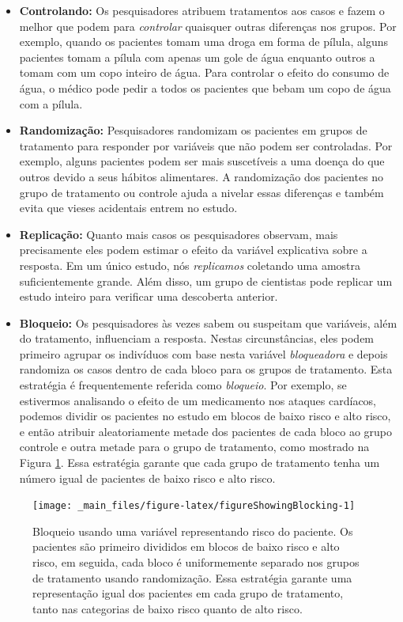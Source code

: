 \documentclass[
]{book}
\theoremstyle{definition}
\theoremstyle{definition}
\theoremstyle{definition}
\theoremstyle{definition}
\theoremstyle{remark}
\begin{document}
\begin{itemize}
\item
  \textbf{Controlando:} Os pesquisadores atribuem tratamentos aos casos e fazem o melhor que podem para \emph{controlar} quaisquer outras diferenças nos grupos. Por exemplo, quando os pacientes tomam uma droga em forma de pílula, alguns pacientes tomam a pílula com apenas um gole de água enquanto outros a tomam com um copo inteiro de água. Para controlar o efeito do consumo de água, o médico pode pedir a todos os pacientes que bebam um copo de água com a pílula.
\item
  \textbf{Randomização:} Pesquisadores randomizam os pacientes em grupos de tratamento para responder por variáveis que não podem ser controladas. Por exemplo, alguns pacientes podem ser mais suscetíveis a uma doença do que outros devido a seus hábitos alimentares. A randomização dos pacientes no grupo de tratamento ou controle ajuda a nivelar essas diferenças e também evita que vieses acidentais entrem no estudo.
\item
  \textbf{Replicação:} Quanto mais casos os pesquisadores observam, mais precisamente eles podem estimar o efeito da variável explicativa sobre a resposta. Em um único estudo, nós \emph{replicamos} coletando uma amostra suficientemente grande. Além disso, um grupo de cientistas pode replicar um estudo inteiro para verificar uma descoberta anterior.
\item
  \textbf{Bloqueio:} Os pesquisadores às vezes sabem ou suspeitam que variáveis, além do tratamento, influenciam a resposta. Nestas circunstâncias, eles podem primeiro agrupar os indivíduos com base nesta variável \emph{bloqueadora} e depois randomiza os casos dentro de cada bloco para os grupos de tratamento. Esta estratégia é frequentemente referida como \emph{bloqueio}. Por exemplo, se estivermos analisando o efeito de um medicamento nos ataques cardíacos, podemos dividir os pacientes no estudo em blocos de baixo risco e alto risco, e então atribuir aleatoriamente metade dos pacientes de cada bloco ao grupo controle e outra metade para o grupo de tratamento, como mostrado na Figura \ref{fig:figureShowingBlocking}. Essa estratégia garante que cada grupo de tratamento tenha um número igual de pacientes de baixo risco e alto risco.
\end{itemize}

\begin{figure}
\texttt{[image: \_main\_files/figure-latex/figureShowingBlocking-1]} \caption{Bloqueio usando uma variável representando risco do paciente. Os pacientes são primeiro divididos em blocos de baixo risco e alto risco, em seguida, cada bloco é uniformemente separado nos grupos de tratamento usando randomização. Essa estratégia garante uma representação igual dos pacientes em cada grupo de tratamento, tanto nas categorias de baixo risco quanto de alto risco.}\label{fig:figureShowingBlocking}
\end{figure}
\end{document}
